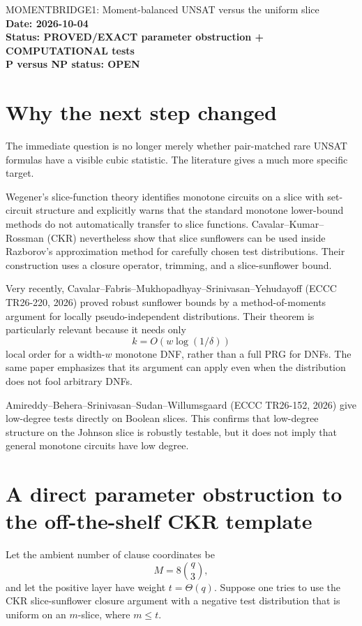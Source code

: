 \documentclass[11pt]{article}
\begin{document}
\begin{center}
{\Large MOMENTBRIDGE1: Moment-balanced UNSAT versus the uniform slice}\\[4pt]
\textbf{Date: 2026-10-04}\\
\textbf{Status: PROVED/EXACT parameter obstruction + COMPUTATIONAL tests}\\
\textbf{P versus NP status: OPEN}
\end{center}

\section{Why the next step changed}

The immediate question is no longer merely whether pair-matched rare UNSAT
formulas have a visible cubic statistic.  The literature gives a much more
specific target.

Wegener's slice-function theory identifies monotone circuits on a slice with
set-circuit structure and explicitly warns that the standard monotone
lower-bound methods do not automatically transfer to slice functions.
Cavalar--Kumar--Rossman (CKR) nevertheless show that slice sunflowers can be
used inside Razborov's approximation method for carefully chosen test
distributions.  Their construction uses a closure operator, trimming, and a
slice-sunflower bound.

Very recently, Cavalar--Fabris--Mukhopadhyay--Srinivasan--Yehudayoff
(ECCC TR26-220, 2026) proved robust sunflower bounds by a method-of-moments
argument for locally pseudo-independent distributions.  Their theorem is
particularly relevant because it needs only
\[
k=O(w\log(1/\delta))
\]
local order for a width-\(w\) monotone DNF, rather than a full PRG for DNFs.
The same paper emphasizes that its argument can apply even when the
distribution does not fool arbitrary DNFs.

Amireddy--Behera--Srinivasan--Sudan--Willumsgaard (ECCC TR26-152, 2026)
give low-degree tests directly on Boolean slices.  This confirms that
low-degree structure on the Johnson slice is robustly testable, but it does
not imply that general monotone circuits have low degree.

\section{A direct parameter obstruction to the off-the-shelf CKR template}

Let the ambient number of clause coordinates be
\[
M=8\binom q3,
\]
and let the positive layer have weight \(t=\Theta(q)\).  Suppose one tries to
use the CKR slice-sunflower closure argument with a negative test distribution
that is uniform on an \(m\)-slice, where \(m\le t\).
\end{document}
